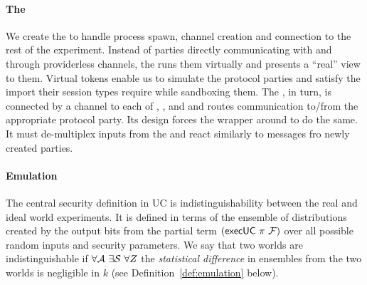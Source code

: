\paragraph*{\textbf{The \partywrapper}}
We create the \partywrapper to handle process spawn, channel creation and connection to the rest of the experiment.
Instead of parties directly communicating with \F and \Z through providerless channels, the \partywrapper runs them virtually and presents a ``real'' view to them.
Virtual tokens enable us to simulate the protocol parties and satisfy the import their session types require while sandboxing them. 
The \partywrapper, in turn, is connected by a channel to each of \F, \Z, and \A and routes communication to/from the appropriate protocol party. 
Its design forces the wrapper around \F to do the same. It must de-multiplex inputs from the \partywrapper and react similarly to messages fro newly created parties. 

\paragraph*{\textbf{Emulation}}
The central security definition in UC is indistinguishability between the real and ideal world experiments.
It is defined in terms of the ensemble of distributions created by the output bits from the partial term
$(\mathsf{execUC}\ \pi\ \mathcal{F})$ over all possible random inputs and security parameters. 
We say that two worlds are indistinguishable if $\forall \mathcal{A}\ \exists \mathcal{S}\ \forall Z$
the \emph{statistical difference} in ensembles from the two worlds is negligible in $k$ (see
Definition~\ref{def:emulation} below).

